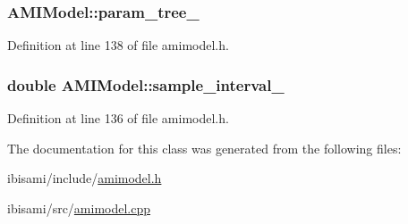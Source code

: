 \subsubsection[{param\+\_\+tree\+\_\+}]{ A\+M\+I\+Model\+::param\+\_\+tree\+\_\+\hspace{0.3cm}{\ttfamily [protected]}}\label{class_a_m_i_model_a4da53456e13a1224f2bb47396ab0ecbd}


Definition at line 138 of file amimodel.\+h.

\hypertarget{class_a_m_i_model_a4d4c286b04668c22f2e3f315715a6d5b}{}
\subsubsection[{sample\+\_\+interval\+\_\+}]{\setlength{\rightskip}{0pt plus 5cm}double A\+M\+I\+Model\+::sample\+\_\+interval\+\_\+\hspace{0.3cm}{\ttfamily [protected]}}\label{class_a_m_i_model_a4d4c286b04668c22f2e3f315715a6d5b}


Definition at line 136 of file amimodel.\+h.



The documentation for this class was generated from the following files\+:\begin{DoxyCompactItemize}
\item 
ibisami/include/\hyperlink{amimodel_8h}{amimodel.\+h}\item 
ibisami/src/\hyperlink{amimodel_8cpp}{amimodel.\+cpp}\end{DoxyCompactItemize}
